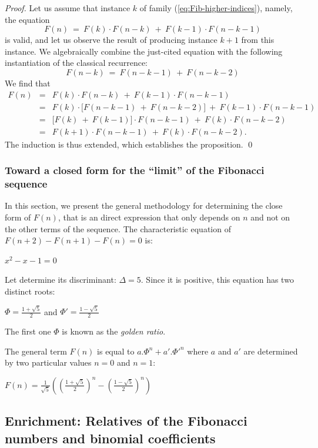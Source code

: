 \begin{proof}
Let us assume that instance $k$ of family
(\ref{eq:Fib-higher-indices}), namely, the equation
\[ F(n) \ = \ F(k) \cdot F(n-k) \ + \ F(k-1) \cdot F(n-k-1) \]
is valid, and let us observe the result of producing instance $k+1$
from this instance.  We algebraically combine the just-cited equation
with the following instantiation of the classical recurrence:
\[ F(n-k) \ = \ F(n-k-1) \ + \ F(n-k-2) \]
We find that
\begin{eqnarray*}
F(n) & = & F(k) \cdot F(n-k) \ + \ F(k-1) \cdot F(n-k-1) \\
     & = & F(k) \cdot \big[ F(n-k-1) \ + \ F(n-k-2) \big]  \ +
             \ F(k-1) \cdot F(n-k-1) \\
     & = & \big[ F(k) \ + \ F(k-1) \big] \cdot F(n-k-1) \ + \ F(k)
             \cdot F(n-k-2) \\
     & = & F(k+1) \cdot F(n-k-1) \ + \ F(k) \cdot F(n-k-2).
\end{eqnarray*}
The induction is thus extended, which establishes the proposition.
\qed 
\end{proof}

\subsubsection{Toward a closed form for the ``limit''  of the
  Fibonacci sequence}
\label{sec:Fib-Golden-Ratio}

In this section, we present the general methodology for determining
the close form of $F(n)$, that is an direct expression that only
depends on $n$ and not on the other terms of the sequence.  The
characteristic equation of $F(n+2) - F(n+1) - F(n) =0$ is:

$x^2 - x - 1 = 0$

Let determine its discriminant: $\Delta = 5$.
Since it is positive, this equation has two distinct roots:

$\Phi = \frac{1+\sqrt{5}}{2}$ and $\Phi' = \frac{1-\sqrt{5}}{2}$

The first one $\Phi$ is known as the \textit{golden ratio}. 

The general term $F(n)$ is equal to $a.\Phi^n + a'.\Phi'^n$ where $a$
and $a'$ are determined by two particular values $n=0$ and $n=1$:

$F(n)= \frac{1}{\sqrt{5}} ((\frac{1+\sqrt{5}}{2})^n - (\frac{1-\sqrt{5}}{2})^n)$


\subsection{Enrichment: Relatives of the Fibonacci numbers and binomial coefficients}
\label{sec:Fibo-relatives}

